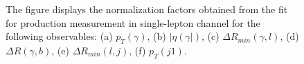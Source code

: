 \begin{figure}[ht]
  \quad
  \caption{ The figure displays the normalization factors obtained from the fit for \tty production measurement in single-lepton channel for the following observables: (a) $p_T(\gamma)$, (b) $|\eta(\gamma|)$, (c) $\Delta R_{min}(\gamma, l)$, (d) $\Delta R(\gamma, b)$, (e) $\Delta R_{min}(l, j)$, (f) $p_T(j1)$.}
  \label{fig:pt_unfolded_ljet_table_realdata}
\end{figure}
\FloatBarrier


